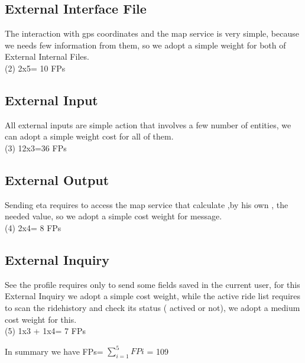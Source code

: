   \subsection{External Interface File}
  The interaction with gps coordinates and the map service is very simple, 
  because we needs few information from them, so we adopt a simple weight for
  both of External Internal Files.\\
(2) 2x5= 10 FPs
  \subsection{External Input}
  All external inputs are simple action that involves a few number of entities,
  we can adopt a simple weight cost for all of them.\\
 (3) 12x3=36 FPs
  \subsection{External Output}
  Sending eta requires to access the map service that calculate ,by his own ,
  the needed value, so we adopt a simple cost weight for message.\\
(4) 2x4= 8 FPs
  \subsection{External Inquiry}
  See the profile requires only to send some fields saved in the current user,
  for this External Inquiry we adopt a simple cost weight, while the active
  ride list requires to scan the ridehistory and check its status ( actived or
  not), we adopt a medium cost weight for this.\\
(5) 1x3 + 1x4= 7 FPs

In summary we have FPs= $\displaystyle\sum_{i=1}^{5} FPi$ = 109